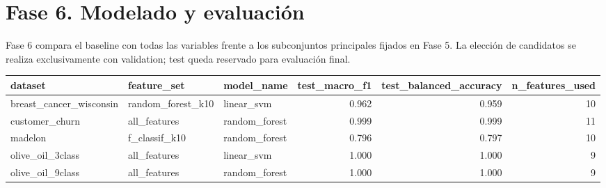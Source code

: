 \section{Fase 6. Modelado y evaluación}\nLa Fase 6 compara el baseline con todas las variables frente a los subconjuntos principales fijados en Fase 5. La elección de candidatos se realiza exclusivamente con validation; test queda reservado para evaluación final.\n\n\begin{tabular}{lllrrr}
\toprule
dataset & feature_set & model_name & test_macro_f1 & test_balanced_accuracy & n_features_used \\
\midrule
breast_cancer_wisconsin & random_forest_k10 & linear_svm & 0.962 & 0.959 & 10 \\
customer_churn & all_features & random_forest & 0.999 & 0.999 & 11 \\
madelon & f_classif_k10 & random_forest & 0.796 & 0.797 & 10 \\
olive_oil_3class & all_features & linear_svm & 1.000 & 1.000 & 9 \\
olive_oil_9class & all_features & random_forest & 1.000 & 1.000 & 9 \\
\bottomrule
\end{tabular}
